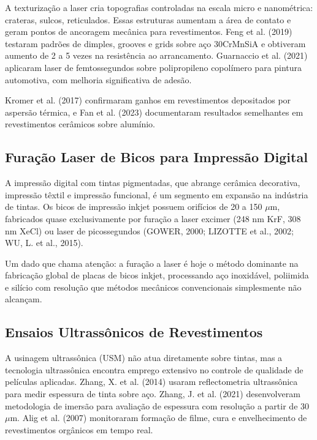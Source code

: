 \documentclass[
  12pt,
  a4paper,
  oneside,
  brazil,
  chapter=TITLE
]{article}
\begin{document}
A texturização a laser cria topografias controladas na escala micro e nanométrica: crateras, sulcos, reticulados. Essas estruturas aumentam a área de contato e geram pontos de ancoragem mecânica para revestimentos. Feng et al. (2019) testaram padrões de dimples, grooves e grids sobre aço 30CrMnSiA e obtiveram aumento de 2 a 5 vezes na resistência ao arrancamento. Guarnaccio et al. (2021) aplicaram laser de femtossegundos sobre polipropileno copolímero para pintura automotiva, com melhoria significativa de adesão.

Kromer et al. (2017) confirmaram ganhos em revestimentos depositados por aspersão térmica, e Fan et al. (2023) documentaram resultados semelhantes em revestimentos cerâmicos sobre alumínio.

\subsection{Furação Laser de Bicos para Impressão Digital}\label{furacao-laser-inkjet}

A impressão digital com tintas pigmentadas, que abrange cerâmica decorativa, impressão têxtil e impressão funcional, é um segmento em expansão na indústria de tintas. Os bicos de impressão inkjet possuem orifícios de 20 a 150 $\mu$m, fabricados quase exclusivamente por furação a laser excimer (248 nm KrF, 308 nm XeCl) ou laser de picossegundos (GOWER, 2000; LIZOTTE et al., 2002; WU, L. et al., 2015).

Um dado que chama atenção: a furação a laser é hoje o método dominante na fabricação global de placas de bicos inkjet, processando aço inoxidável, poliimida e silício com resolução que métodos mecânicos convencionais simplesmente não alcançam.

\subsection{Ensaios Ultrassônicos de Revestimentos}\label{ensaios-ultrasonicos}

A usinagem ultrassônica (USM) não atua diretamente sobre tintas, mas a tecnologia ultrassônica encontra emprego extensivo no controle de qualidade de películas aplicadas. Zhang, X. et al. (2014) usaram reflectometria ultrassônica para medir espessura de tinta sobre aço. Zhang, J. et al. (2021) desenvolveram metodologia de imersão para avaliação de espessura com resolução a partir de 30 $\mu$m. Alig et al. (2007) monitoraram formação de filme, cura e envelhecimento de revestimentos orgânicos em tempo real.
\end{document}
